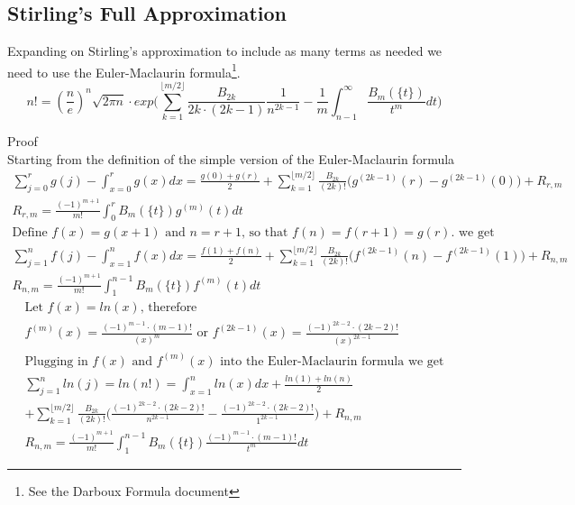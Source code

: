 \documentclass[a4paper]{article}
\begin{document}
\subsection{Stirling's Full Approximation}
\begin{theorem}
Expanding on Stirling's approximation to include as many terms as needed we need to use the Euler-Maclaurin formula\footnote{See the Darboux Formula document}.
\begin{equation}
\boxed{
n! = (\frac{n}{e})^n \sqrt{2\pi n} \cdot
exp \Big( \sum_{k=1}^{\lfloor m/2 \rfloor} \frac{B_{2k}}{2k \cdot (2k-1)} \frac{1}{n^{2k-1}} - \frac{1}{m} \int_{n-1}^{\infty} \frac{B_m(\{t\})}{t^m}  dt \Big)
}
\end{equation}

Proof
\\
Starting from the definition of the simple version of the Euler-Maclaurin formula
\begin{gather*}
\sum_{j=0}^{r} g(j)  - \int_{x=0}^{r} g(x) dx 
=
\frac{g(0) + g(r)}{2} + 
\sum_{k=1}^{\lfloor m/2 \rfloor} \frac{B_{2k}}{(2k)!} \Big(g^{(2k-1)}(r) - g^{(2k-1)}(0)\Big) + R_{r,m}
\\
R_{r,m} = \frac{(-1)^{m+1} }{m!} \int_{0}^{r} B_m(\{t\}) g^{(m)}(t) dt
\\
\text{Define $f(x) = g(x+1)$ and $n = r+1$, so that $f(n) = f(r+1) = g(r)$. we get}
\\
\sum_{j=1}^{n} f(j)  - \int_{x=1}^{n} f(x) dx 
=
\frac{f(1) + f(n)}{2} + 
\sum_{k=1}^{\lfloor m/2 \rfloor} \frac{B_{2k}}{(2k)!} \Big(f^{(2k-1)}(n) - f^{(2k-1)}(1)\Big) + R_{n,m}
\\
R_{n,m} = \frac{(-1)^{m+1} }{m!} \int_{1}^{n-1} B_m(\{t\}) f^{(m)}(t) dt
\end{gather*}
\begin{gather*}
\text{Let $f(x) = ln(x)$, therefore}
\\
f^{(m)}(x) = \frac{(-1)^{m-1} \cdot (m-1)!}{(x)^m}  \text{  or  }
f^{(2k-1)}(x) = \frac{(-1)^{2k-2} \cdot (2k-2)!}{(x)^{2k-1}}
\\
\text{Plugging in $f(x)$ and $f^{(m)}(x)$ into the Euler-Maclaurin formula we get}
\\
\sum_{j=1}^{n} ln(j) = ln(n!) = \int_{x=1}^{n} ln(x) dx 
+
\frac{ln(1) + ln(n)}{2} 
\\
+ \sum_{k=1}^{\lfloor m/2 \rfloor} \frac{B_{2k}}{(2k)!} \Big(\frac{(-1)^{2k-2} \cdot (2k-2)!}{n^{2k-1}} - \frac{(-1)^{2k-2} \cdot (2k-2)!}{1^{2k-1}}\Big) + R_{n,m}
\\
R_{n,m} = \frac{(-1)^{m+1} }{m!} \int_{1}^{n-1} B_m(\{t\}) \frac{(-1)^{m-1} \cdot (m-1)!}{t^m}  dt

\end{gather*}
\end{theorem}
\end{document}
